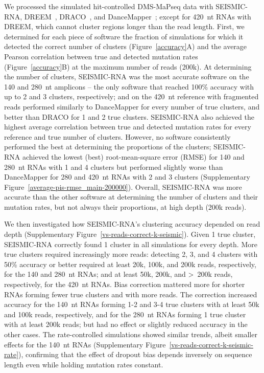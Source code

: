 \documentclass[unnumsec,webpdf,contemporary,large]{oup-authoring-template}%
\theoremstyle{thmstyleone}%
\theoremstyle{thmstyletwo}%
\theoremstyle{thmstylethree}%
\begin{document}
We processed the simulated hit-controlled DMS-MaPseq data with SEISMIC-RNA, DREEM~\cite{Tomezsko2020}, DRACO~\cite{Morandi2021}, and DanceMapper~\cite{Olson2022}; except for 420~nt RNAs with DREEM, which cannot cluster regions longer than the read length.
First, we determined for each piece of software the fraction of simulations for which it detected the correct number of clusters (Figure~\ref{accuracy}A) and the average Pearson correlation between true and detected mutation rates (Figure~\ref{accuracy}B) at the maximum number of reads (200k).
At determining the number of clusters, SEISMIC-RNA was the most accurate software on the 140 and 280~nt amplicons -- the only software that reached 100\% accuracy with up to 2 and 3 clusters, respectively; and on the 420~nt reference with fragmented reads performed similarly to DanceMapper for every number of true clusters, and better than DRACO for 1 and 2 true clusters.
SEISMIC-RNA also achieved the highest average correlation between true and detected mutation rates for every reference and true number of clusters.
However, no software consistently performed the best at determining the proportions of the clusters; SEISMIC-RNA achieved the lowest (best) root-mean-square error (RMSE) for 140 and 280~nt RNAs with 1 and 4 clusters but performed slightly worse than DanceMapper for 280 and 420~nt RNAs with 2 and 3 clusters (Supplementary Figure~\ref{average-pis-rmse_main-200000}).
Overall, SEISMIC-RNA was more accurate than the other software at determining the number of clusters and their mutation rates, but not always their proportions, at high depth (200k reads).

We then investigated how SEISMIC-RNA's clustering accuracy depended on read depth (Supplementary Figure~\ref{vs-reads-correct-k-seismic}).
Given 1 true cluster, SEISMIC-RNA correctly found 1 cluster in all simulations for every depth.
More true clusters required increasingly more reads: detecting 2, 3, and 4 clusters with 50\% accuracy or better required at least 20k, 100k, and 200k reads, respectively, for the 140 and 280~nt RNAs; and at least 50k, 200k, and \textgreater~200k reads, respectively, for the 420~nt RNAs.
Bias correction mattered more for shorter RNAs forming fewer true clusters and with more reads.
The correction increased accuracy for the 140~nt RNAs forming 1-2 and 3-4 true clusters with at least 50k and 100k reads, respectively, and for the 280~nt RNAs forming 1 true cluster with at least 200k reads; but had no effect or slightly reduced accuracy in the other cases.
The rate-controlled simulations showed similar trends, albeit smaller effects for the 140~nt RNAs (Supplementary Figure~\ref{vs-reads-correct-k-seismic-rate}), confirming that the effect of dropout bias depends inversely on sequence length even while holding mutation rates constant.
\end{document}
